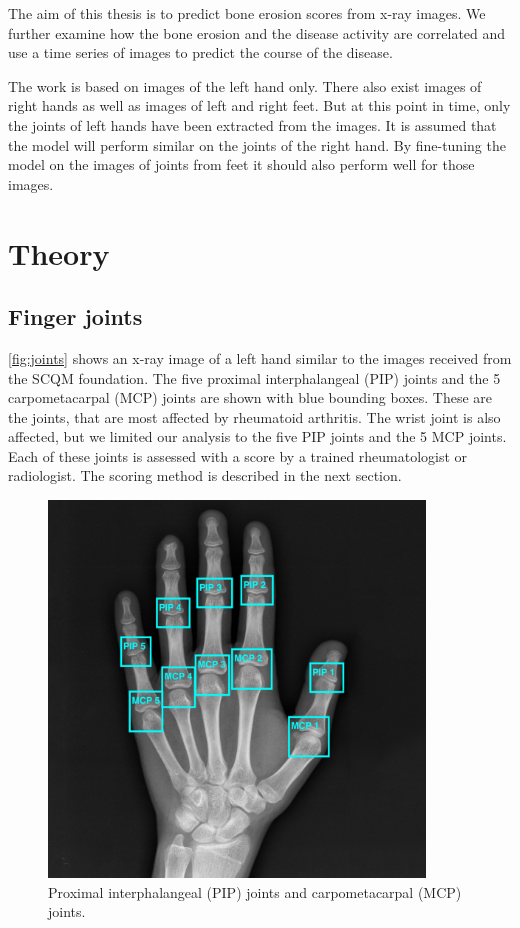 \documentclass[12pt]{article}
\begin{document}
The aim of this thesis is to predict bone erosion scores from x-ray images. We further examine how the bone erosion and the disease activity are correlated and use a time series of images to predict the course of the disease.

The work is based on images of the left hand only. There also exist images of right hands as well as images of left and right feet. But at this point in time, only the joints of left hands have been extracted from the images. It is assumed that the model will perform similar on the joints of the right hand. By fine-tuning the model on the images of joints from feet it should also perform well for those images.

\newpage

\section{Theory}
\label{sec:theory}

\subsection{Finger joints}
\label{subsec:joints}

\autoref{fig:joints} shows an x-ray image of a left hand similar to the images received from the SCQM foundation. The five proximal interphalangeal (PIP) joints and the 5 carpometacarpal (MCP) joints are shown with blue bounding boxes. These are the joints, that are most affected by rheumatoid arthritis. The wrist joint is also affected, but we limited our analysis to the five PIP joints and the 5 MCP joints. Each of these joints is assessed with a score by a trained rheumatologist or radiologist. The scoring method is described in the next section.

\begin{figure}[ht]
\includegraphics[width=10cm]{joints}	
\caption{Proximal interphalangeal (PIP) joints and carpometacarpal  (MCP) joints.}
\label{fig:joints}
\end{figure}
\end{document}
